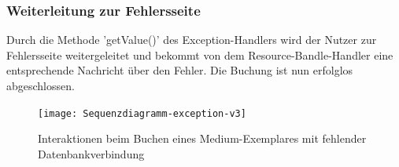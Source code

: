 \documentclass{article}
\begin{document}
\subsubsection{Weiterleitung zur Fehlersseite}
Durch die Methode 'getValue()' des Exception-Handlers wird der Nutzer zur Fehlersseite weitergeleitet und bekommt von dem Resource-Bandle-Handler eine entsprechende Nachricht über den Fehler. Die Buchung ist nun erfolglos abgeschlossen.

\newpage


\begin{figure}[h]
	\hypertarget{Fehlersequenz}{}
    \centering
    \texttt{[image: Sequenzdiagramm-exception-v3]}
    \caption{Interaktionen beim Buchen eines Medium-Exemplares mit fehlender Datenbankverbindung}
    \label{Sequenzdiagramm}
\end{figure}

\restoregeometry
\newpage

\end{document}
